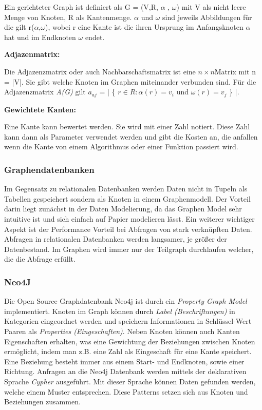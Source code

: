 	Ein gerichteter Graph ist definiert als G = (V,R, $\alpha$ , $\omega$) mit V als nicht leere Menge von Knoten, R als Kantenmenge.  $\alpha$ und $\omega$ sind jeweils Abbildungen für die gilt r($\alpha$,$\omega$), wobei r eine Kante ist die ihren Ursprung im Anfangsknoten $\alpha$ hat und im Endknoten $\omega$ endet. \cite[7]{Krumke2012}
	\newline
	
	\textbf{Adjazenmatrix:}
	
	Die Adjazenzmatrix oder auch Nachbarschaftsmatrix ist eine  $n\times n $Matrix mit n = |V|. Sie gibt welche Knoten im Graphen miteinander verbunden sind. Für die Adjazenzmatrix \textit{A(G)} gilt $a_{aj}$ = | \{ $r \in R: \alpha(r) = v_{i}$ und $\omega(r) = v_{j} $ \} |. \cite[17ff]{Krumke2012}\newline	

	\textbf{Gewichtete Kanten:}
	
	Eine Kante kann bewertet werden. Sie wird mit einer Zahl notiert. Diese Zahl kann dann als Parameter verwendet werden und gibt die Kosten an, die anfallen wenn die Kante von einem Algorithmus oder einer Funktion passiert wird.
	\cite[18]{Krumke2012}
	
	
	
	\subsubsection{Graphendatenbanken}	
	Im Gegensatz zu relationalen Datenbanken werden Daten nicht in Tupeln als Tabellen gespeichert sondern als Knoten in einem Graphenmodell. Der Vorteil darin liegt zunächst in der Daten Modelierung, da das Graphen Model sehr intuitive ist und sich einfach auf Papier modelieren lässt. 
	Ein weiterer wichtiger Aspekt ist der Performance Vorteil bei Abfragen von stark verknüpften Daten. Abfragen in relationalen Datenbanken werden langsamer, je größer der Datenbestand. Im Graphen wird immer nur der Teilgraph durchlaufen welcher, die die Abfrage erfüllt.\cite[8]{robinson_webber_eifrem_2015}
	
	\subsubsection{Neo4J}
	
	Die Open Source Graphdatenbank Neo4j ist durch ein \textit{Property Graph Model} implementiert. Knoten im Graph können durch \emph{Label (Beschriftungen)} in Kategorien eingeordnet werden und speichern Informationen in Schlüssel-Wert Paaren als \emph{Properties (Eingeschaften)}. 
	Neben Knoten können auch Kanten Eigenschaften erhalten, was eine Gewichtung der Beziehungen zwischen Knoten ermöglicht, indem man z.B. eine Zahl als Eingeschaft für eine Kante speichert. Eine Beziehung besteht immer aus einem Start- und Endknoten, sowie einer Richtung.\cite[26]{Robinson2015}
	Anfragen an die Neo4j Datenbank werden mittels der deklarativen Sprache \textit{Cypher} ausgeführt. Mit dieser Sprache können Daten gefunden werden, welche einem Muster  entsprechen. Diese Patterns setzen sich aus Knoten und Beziehungen zusammen.\newline
	
